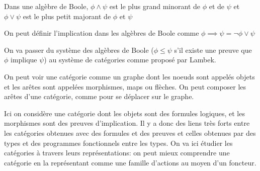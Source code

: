 \documentclass[math]{cours}
\begin{document}
Dans une algèbre de Boole, $\phi \land \psi$ est le plus grand minorant de $\phi$ et de $\psi$ et $\phi \lor \psi$ est le plus petit majorant de $\phi$ et $\psi$
\begin{remarque}
	On peut définir l'implication dans les algèbres de Boole comme $\phi \implies \psi = \lnot\phi \lor \psi$
	\label{rem:implicationboole}
\end{remarque}
On va passer du système des algèbres de Boole ($\phi \leq \psi$ s'il existe une preuve que $\phi$ implique $\psi$)
au système de catégories comme proposé par Lambek.
\begin{definition}
	On peut voir une catégorie comme un graphe dont les noeuds sont appelés objets et les arêtes sont appelées morphismes, maps ou flèches.
	On peut composer les arêtes d'une catégorie, comme pour se déplacer sur le graphe.
\end{definition}
Ici on considère une catégorie dont les objets sont des formules logiques, et les morphismes sont des preuves d'implication.
Il y a donc des liens très forts entre les catégories obtenues avec des formules et des preuves et celles obtenues par des types et des programmes fonctionnels entre les types.
On va ici étudier les catégories à travers leurs représentations: on peut mieux comprendre une catégorie en la représentant comme une famille d'actions au moyen d'un foncteur.
\end{document}
